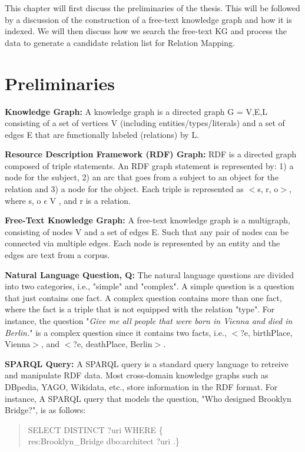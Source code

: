 \begin{sloppypar}
This chapter will first discuss the preliminaries of the thesis. This will be followed by a discussion of the construction of a free-text knowledge graph and how it is indexed. We will then discuss how we search the free-text KG and process the data to generate a candidate relation list for Relation Mapping. 

\section{Preliminaries}
\textbf{Knowledge Graph:} A knowledge graph is a directed graph G = {V,E,L} consisting of a set of vertices V (including entities/types/literals) and a set of edges E
that are functionally labeled (relations) by L.

\textbf{Resource Description Framework (RDF) Graph:} RDF is a directed graph composed of triple statements. An RDF graph statement is represented by: 1) a node for the subject, 2) an arc that goes from a subject to an object for the relation and 3) a node for the object. Each triple is represented as $<$s, r, o$>$, where s, o $\epsilon$ V , and r is a relation.

\textbf{Free-Text Knowledge Graph:} A free-text knowledge graph is a multigraph, consisting of nodes V and a set of edges E. Such that any pair of nodes can be connected via multiple edges. Each node is represented by an entity and the edges are text from a corpus.  

\textbf{Natural Language Question, Q:} The natural language questions are divided into two categories, i.e., "simple" and "complex". A simple question is a question that just contains one fact. A complex question contains more than one fact, where the fact is a triple that is not equipped with the relation "type". For instance, the question "\textit{Give me all people that were born in Vienna and died in Berlin.}" is a complex question since it contains two facts, i.e., $<$?e, birthPlace, Vienna$>$, and $<$?e, deathPlace, Berlin$>$.

\textbf{SPARQL Query:} A SPARQL query is a standard query language to retreive and manipulate RDF data. Most cross-domain knowledge graphs such as DBpedia, YAGO, Wikidata, etc., store information in the RDF format. For instance, A SPARQL query that models the question, "Who designed Brooklyn Bridge?", is as follows:
\begin{quote}
{\selectfont
SELECT DISTINCT ?uri WHERE \{ \\
res:Brooklyn\_Bridge dbo:architect ?uri .\}}
\end{quote}


\end{sloppypar}
